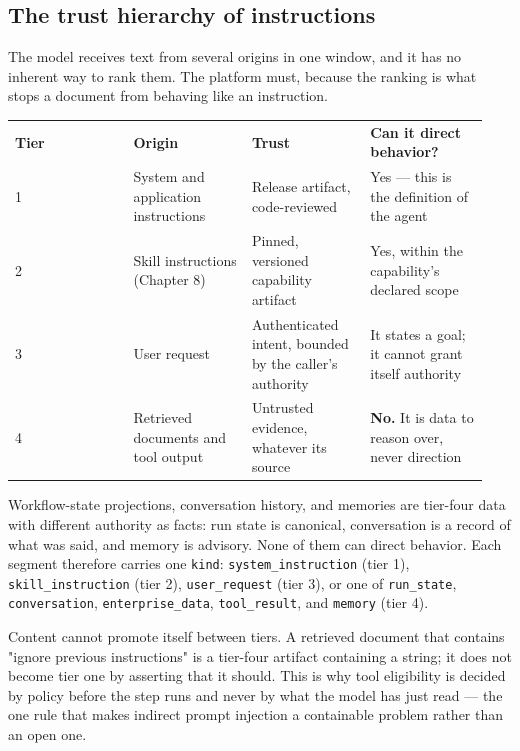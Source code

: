 \subsection{The trust hierarchy of instructions}

The model receives text from several origins in one window, and it has no inherent way to rank them. The platform must, because the ranking is what stops a document from behaving like an instruction.\par

\BookTableStart
\fontsize{7.2}{9}\selectfont
\begin{tabular}{@{}Y{0.2350\linewidth}Y{0.2350\linewidth}Y{0.2350\linewidth}Y{0.2350\linewidth}@{}}
\color{white}\bfseries Tier & \color{white}\bfseries Origin & \color{white}\bfseries Trust & \color{white}\bfseries Can it direct behavior? \\
1 & System and application instructions & Release artifact, code-reviewed & Yes — this is the definition of the agent \\
2 & Skill instructions (Chapter 8) & Pinned, versioned capability artifact & Yes, within the capability's declared scope \\
3 & User request & Authenticated intent, bounded by the caller's authority & It states a goal; it cannot grant itself authority \\
4 & Retrieved documents and tool output & Untrusted evidence, whatever its source & \textbf{No.} It is data to reason over, never direction \\
\end{tabular}
\BookTableEnd

Workflow-state projections, conversation history, and memories are tier-four data with different authority as facts: run state is canonical, conversation is a record of what was said, and memory is advisory. None of them can direct behavior. Each segment therefore carries one \lstinline[style=bookinline]!kind!: \lstinline[style=bookinline]!system_instruction! (tier 1), \lstinline[style=bookinline]!skill_instruction! (tier 2), \lstinline[style=bookinline]!user_request! (tier 3), or one of \lstinline[style=bookinline]!run_state!, \lstinline[style=bookinline]!conversation!, \lstinline[style=bookinline]!enterprise_data!, \lstinline[style=bookinline]!tool_result!, and \lstinline[style=bookinline]!memory! (tier 4).\par

Content cannot promote itself between tiers. A retrieved document that contains "ignore previous instructions" is a tier-four artifact containing a string; it does not become tier one by asserting that it should. This is why tool eligibility is decided by policy before the step runs and never by what the model has just read — the one rule that makes indirect prompt injection a containable problem rather than an open one.\par

